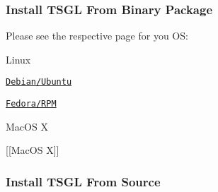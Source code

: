 \subsubsection*{Install T\-S\-G\-L From Binary Package}

Please see the respective page for you O\-S\-:


\begin{DoxyItemize}
\item Linux
\begin{DoxyItemize}
\item \href{https://github.com/Calvin-CS/TSGL/wiki/Debian-%28Aptitude%29}{\tt Debian/\-Ubuntu}
\item \href{https://github.com/Calvin-CS/TSGL/wiki/RPM}{\tt Fedora/\-R\-P\-M}
\end{DoxyItemize}
\item Mac\-O\-S X
\begin{DoxyItemize}
\item \mbox{[}\mbox{[}Mac\-O\-S X\mbox{]}\mbox{]}
\end{DoxyItemize}
\end{DoxyItemize}

\subsubsection*{Install T\-S\-G\-L From Source}